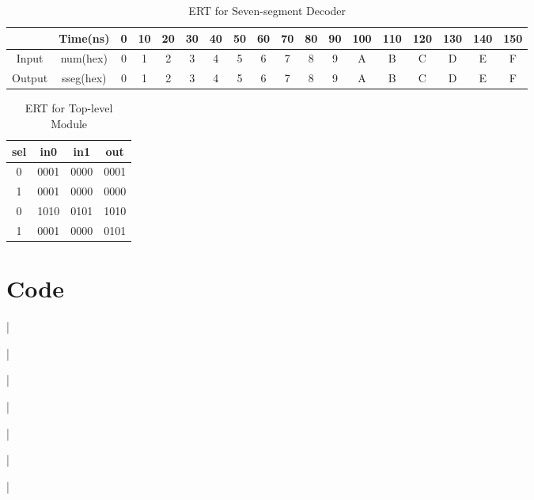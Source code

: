 \documentclass[11pt]{article}
\newcommand{\Verilog}[2][]{%
	
}
\begin{document}
\begin{table}[ht]\centering
	\caption{ERT for Seven-segment Decoder}
	\label{tbl:example_table}
	\begin{tabular}{cc|cccccccccccccccc}
		\toprule
		& Time(ns) & 0 & 10 & 20 & 30 & 40 & 50 & 60 & 70 & 80 & 90 & 100 & 110 & 120 & 130 & 140 & 150 \\
		\midrule
		Input & num(hex) & 0 & 1 & 2 & 3 & 4 & 5 & 6 & 7 & 8 & 9 & A & B & C & D & E & F \\
		Output & sseg(hex)  & 0 & 1 & 2 & 3 & 4 & 5 & 6 & 7 & 8 & 9 & A & B & C & D & E & F \\
		\bottomrule
	\end{tabular} 
\end{table}

\begin{table}[ht]\centering
	\caption{ERT for Top-level Module}
	\label{tbl:example_table}
	\begin{tabular}{ccc|c}
		\toprule
		sel & in0 & in1 & out \\
		\midrule
		0 & 0001 & 0000 & 0001 \\
		1 & 0001 & 0000 & 0000 \\
		0 & 1010 & 0101 & 1010 \\
		1 & 0001 & 0000 & 0101 \\
		\bottomrule
	\end{tabular} 
\end{table}

\section*{Code}

\Verilog[firstline=22, lastline=31, caption=MUX Verilog code]{Lab06_project/codedirectory/mux2_4b.sv}|

\Verilog[firstline=22, lastline=45, caption=MUX Test Verilog code]{Lab06_project/codedirectory/mux2_4b_test.sv}|

\Verilog[firstline=22, lastline=51, caption=Seven-segment Decoder Verilog code]{Lab06_project/codedirectory/sseg_decoder.sv}|

\Verilog[firstline=22, lastline=42, caption=Seven-segment Decoder Test Verilog code]{Lab06_project/codedirectory/sseg_decoder_test.sv}|

\Verilog[firstline=22, lastline=43, caption=Seven-segment Wrapper Verilog code]{Lab06_project/codedirectory/sseg1_wrapper.sv}|

\Verilog[firstline=22, lastline=53, caption=Seven-segment 1 Verilog code]{Lab06_project/codedirectory/sseg1.sv}|

\Verilog[firstline=22, lastline=57, caption=Seven-segment 1 Test Verilog code]{Lab06_project/codedirectory/sseg1_test.sv}|
\end{document}
